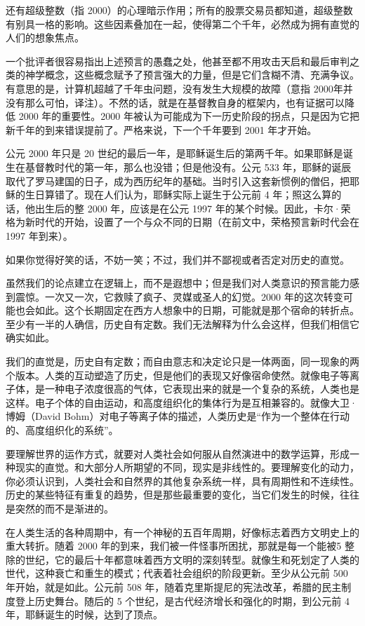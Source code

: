 还有超级整数（指 2000）的心理暗示作用；所有的股票交易员都知道，超级整数有别具一格的影响。这些因素叠加在一起，使得第二个千年，必然成为拥有直觉的人们的想象焦点。


一个批评者很容易指出上述预言的愚蠢之处，他甚至都不用攻击天启和最后审判之类的神学概念，这些概念赋予了预言强大的力量，但是它们含糊不清、充满争议。有意思的是，计算机超越了千年虫问题，没有发生大规模的故障（意指 2000年并没有那么可怕，译注）。不然的话，就是在基督教自身的框架内，也有证据可以降低 2000 年的重要性。2000 年被认为可能成为下一历史阶段的拐点，只是因为它把新千年的到来错误提前了。严格来说，下一个千年要到 2001 年才开始。


公元 2000 年只是 20 世纪的最后一年，是耶稣诞生后的第两千年。如果耶稣是诞生在基督教时代的第一年，那么也没错；但是他没有。公元 533 年，耶稣的诞辰取代了罗马建国的日子，成为西历纪年的基础。当时引入这套新惯例的僧侣，把耶稣的生日算错了。现在人们认为，耶稣实际上诞生于公元前 4 年；照这么算的话，他出生后的整 2000 年，应该是在公元 1997 年的某个时候。因此，卡尔·荣格为新时代的开始，设置了一个与众不同的日期（在前文中，荣格预言新时代会在 1997 年到来）。


如果你觉得好笑的话，不妨一笑；不过，我们并不鄙视或者否定对历史的直觉。


虽然我们的论点建立在逻辑上，而不是遐想中；但是我们对人类意识的预言能力感到震惊。一次又一次，它救赎了疯子、灵媒或圣人的幻觉。2000 年的这次转变可能也会如此。这个长期固定在西方人想象中的日期，可能就是那个宿命的转折点。至少有一半的人确信，历史自有定数。我们无法解释为什么会这样，但我们相信它确实如此。


我们的直觉是，历史自有定数；而自由意志和决定论只是一体两面，同一现象的两个版本。人类的互动塑造了历史，但是他们的表现又好像宿命使然。就像电子等离子体，是一种电子浓度很高的气体，它表现出来的就是一个复杂的系统，人类也是这样。电子个体的自由运动，和高度组织化的集体行为是互相兼容的。就像大卫·博姆（David Bohm）对电子等离子体的描述，人类历史是“作为一个整体在行动的、高度组织化的系统”。


要理解世界的运作方式，就要对人类社会如何服从自然演进中的数学运算，形成一种现实的直觉。和大部分人所期望的不同，现实是非线性的。要理解变化的动力，你必须认识到，人类社会和自然界的其他复杂系统一样，具有周期性和不连续性。历史的某些特征有重复的趋势，但是那些最重要的变化，当它们发生的时候，往往是突然的而不是渐进的。


在人类生活的各种周期中，有一个神秘的五百年周期，好像标志着西方文明史上的重大转折。随着 2000 年的到来，我们被一件怪事所困扰，那就是每一个能被5 整除的世纪，它的最后十年都意味着西方文明的深刻转型。就像生和死划定了人类的世代，这种衰亡和重生的模式；代表着社会组织的阶段更新。至少从公元前 500 年开始，就是如此。公元前 508 年，随着克里斯提尼的宪法改革，希腊的民主制度登上历史舞台。随后的 5 个世纪，是古代经济增长和强化的时期，到公元前 4 年，耶稣诞生的时候，达到了顶点。


